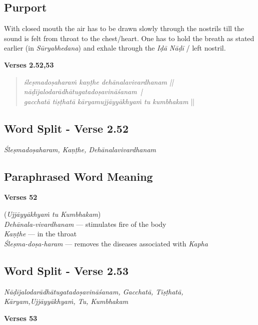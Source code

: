 \subsection*{Purport}

With closed mouth the air has to be drawn slowly through the nostrils till the sound is felt from throat to the chest/heart. One has to hold the breath as stated earlier (in \textit{Sūryabhedana}) and exhale through the \textit{Iḍā Nāḍī} / left nostril.    
\newpage


\noindent \textbf{Verses 2.52,53}

\begin{verse}
\textit{śleṣmadoṣaharaṁ kaṇṭhe dehānalavivardhanam ||\\
nāḍījalodarādhātugatadoṣavināśanam |\\
gacchatā tiṣṭhatā kāryamujjāyyākhyaṁ tu kumbhakam} ||
\end{verse}

\subsection*{Word Split - Verse 2.52}

\textit{Śleṣmadoṣaharam, Kaṇṭhe, Dehānalavivardhanam}

\subsection*{Paraphrased Word Meaning}

\noindent \textbf{Verses 52}

\begin{multicols}{2}
(\textit{Ujjāyyākhyaṁ tu Kumbhakam})\\
\textit{Dehānala-vivardhanam }--- stimulates fire of the body \\
\textit{Kaṇṭhe} --- in the throat  \\
\textit{Śleṣma-doṣa-haram }--- removes the diseases associated with \textit{Kapha} 
\end{multicols}

\subsection*{Word Split - Verse 2.53}

\textit{Nāḍījalodarādhātugatadoṣavināśanam, Gacchatā, Tiṣṭhatā, Kāryam,\break Ujjāyyākhyaṁ, Tu, Kumbhakam}

\noindent \textbf{Verses 53}

